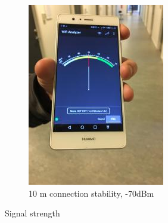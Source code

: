 \begin{figure}[h]
\begin{subfigure}{.49\textwidth}
        \includegraphics[width=\textwidth]{figures/image2.jpg} 
        \caption{10 m connection stability, -70dBm}
        \label{fig:wifitest2}
    \end{subfigure}
\caption{Signal strength}
\label{fig:wifitest12}
\end{figure}